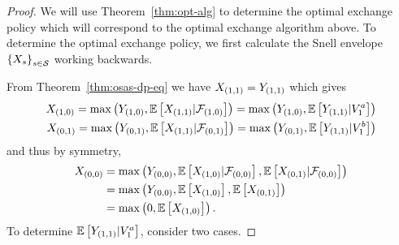 \begin{proof}
    We will use Theorem~\ref{thm:opt-alg} to determine the optimal exchange policy which will correspond to 
    the optimal exchange algorithm above. 
    To determine the optimal exchange policy, we first calculate the Snell envelope
    \(
        \left\{
            X_{s}
        \right\}_{s\in\mathcal{S}}
    \) working backwards.

    From Theorem~\ref{thm:osas-dp-eq} we have
    \(
        X_{(1,1)}
        =
        Y_{(1,1)}
    \)
    which gives
    \begin{align*}
        X_{(1,0)}
        =
        \max\left(
            Y_{(1,0)},
            \mathbb{E}\left[
                X_{(1,1)}
                | \mathcal{F}_{(1,0)}
            \right]
        \right)
        =
        \max\left(
            Y_{(1,0)},
            \mathbb{E}\left[
                Y_{(1,1)}
                | V^a_{1}
            \right]
        \right)
        \\
        X_{(0,1)}
        =
        \max\left(
            Y_{(0,1)},
            \mathbb{E}\left[
                X_{(1,1)}
                | \mathcal{F}_{(0,1)}
            \right]
        \right)
        =
        \max\left(
            Y_{(0,1)},
            \mathbb{E}\left[
                Y_{(1,1)}
                | V^b_{1}
            \right]
        \right)
    \end{align*}  
    and thus by symmetry,
    \begin{align*}
        X_{(0,0)}
        &=
        \max\left(
            Y_{(0,0)},
            \mathbb{E}\left[
                X_{(1,0)}
                | \mathcal{F}_{(0,0)}
            \right],
            \mathbb{E}\left[
                X_{(0,1)}
                | \mathcal{F}_{(0,0)}
            \right]
        \right)
        \\
        &=
        \max\left(
            Y_{(0,0)},
            \mathbb{E}\left[
                X_{(1,0)}
            \right],
            \mathbb{E}\left[
                X_{(0,1)}
            \right]
        \right)
        \\
        &=
        \max\left(
            0,
            \mathbb{E}\left[
                X_{(1,0)}
            \right]
        \right) .
    \end{align*}  
    To determine
    \(
        \mathbb{E}\left[
            Y_{(1,1)}
            | V^a_{1}
        \right]
    \), consider two cases.


\end{proof}
